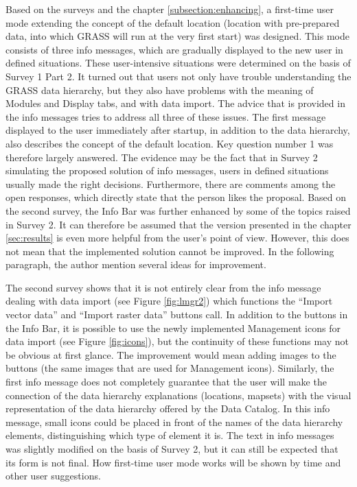 \documentclass[a4paper,10pt,twoside]{article}
\begin{document}
Based on the surveys and the chapter \ref{subsection:enhancing}, a first-time user mode extending the concept of the default location (location with pre-prepared data, into which GRASS will run at the very first start) was designed. This mode consists of three info messages, which are gradually displayed to the new user in defined situations. These user-intensive situations were determined on the basis of Survey 1 Part 2. It turned out that users not only have trouble understanding the GRASS data hierarchy, but they also have problems with the meaning of Modules and Display tabs, and with data import. The advice that is provided in the info messages tries to address all three of these issues. The first message displayed to the user immediately after startup, in addition to the data hierarchy, also describes the concept of the default location. Key question number 1 was therefore largely answered. The evidence may be the fact that in Survey 2 simulating the proposed solution of info messages, users in defined situations usually made the right decisions. Furthermore, there are comments among the open responses, which directly state that the person likes the proposal. Based on the second survey, the Info Bar was further enhanced by some of the topics raised in Survey 2. It can therefore be assumed that the version presented in the chapter \ref{sec:results} is even more helpful from the user's point of view. However, this does not mean that the implemented solution cannot be improved. In the following paragraph, the author mention several ideas for improvement.

The second survey shows that it is not entirely clear from the info message dealing with data import (see Figure \ref{fig:lmgr2}) which functions the ``Import vector data'' and ``Import raster data'' buttons call. In addition to the buttons in the Info Bar, it is possible to use the newly implemented Management icons for data import (see Figure \ref{fig:icons}), but the continuity of these functions may not be obvious at first glance. The improvement would mean adding images to the buttons (the same images that are used for Management icons). Similarly, the first info message does not completely guarantee that the user will make the connection of the data hierarchy explanations (locations, mapsets) with the visual representation of the data hierarchy offered by the Data Catalog. In this info message, small icons could be placed in front of the names of the data hierarchy elements, distinguishing which type of element it is. The text in info messages was slightly modified on the basis of Survey 2, but it can still be expected that its form is not final. How first-time user mode works will be shown by time and other user suggestions.
\end{document}
